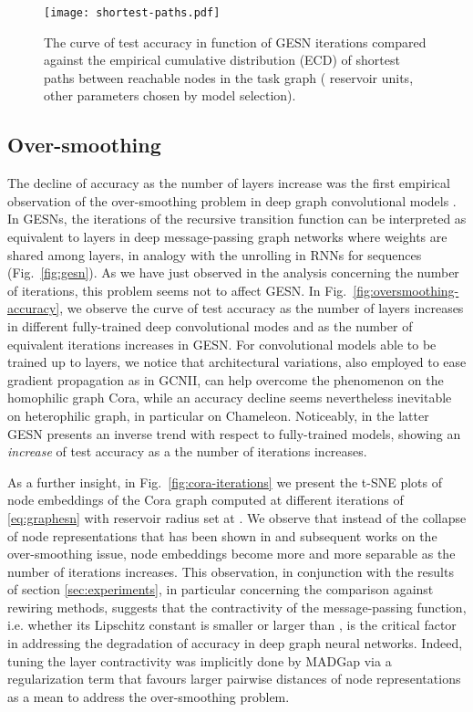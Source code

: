 \documentclass[final,5p,times,twocolumn]{elsarticle}
\begin{document}
\begin{figure*}
	\centering
	\texttt{[image: shortest-paths.pdf]}
	\caption{The curve of test accuracy in function of GESN iterations  compared against the empirical cumulative distribution (ECD) of shortest paths between reachable nodes in the task graph ( reservoir units, other parameters chosen by model selection).}
	\label{fig:shortest-paths}
\end{figure*}

\subsection{Over-smoothing}

The decline of accuracy as the number of layers increase was the first empirical observation of the over-smoothing problem in deep graph convolutional models \cite{Li2018}.
In GESNs, the iterations of the recursive transition function can be interpreted as equivalent to layers in deep message-passing graph networks where weights are shared among layers, in analogy with the unrolling in RNNs for sequences (Fig.~\ref{fig:gesn}).
As we have just observed in the analysis concerning the number of iterations, this problem seems not to affect GESN.
In Fig.~\ref{fig:oversmoothing-accuracy}, we observe the curve of test accuracy as the number of layers increases in different fully-trained deep convolutional modes and as the number of equivalent iterations increases in GESN.
For convolutional models able to be trained up to  layers, we notice that architectural variations, also employed to ease gradient propagation as in GCNII, can help overcome the phenomenon on the homophilic graph Cora, while an accuracy decline seems nevertheless inevitable on heterophilic graph, in particular on Chameleon.
Noticeably, in the latter GESN presents an inverse trend with respect to fully-trained models, showing an \emph{increase} of test accuracy as a the number of iterations increases.

As a further insight, in Fig.~\ref{fig:cora-iterations} we present the t-SNE plots of node embeddings of the Cora graph computed at different iterations of \eqref{eq:graphesn} with reservoir radius set at .
We observe that instead of the collapse of node representations that has been shown in \cite{Li2018} and subsequent works on the over-smoothing issue, node embeddings become more and more separable as the number of iterations increases.
This observation, in conjunction with the results of section \ref{sec:experiments}, in particular concerning the comparison against rewiring methods, suggests that the contractivity of the message-passing function, i.e. whether its Lipschitz constant is smaller or larger than , is the critical factor in addressing the degradation of accuracy in deep graph neural networks.
Indeed, tuning the layer contractivity was implicitly done by MADGap \cite{Chen2020} via a regularization term that favours larger pairwise distances of node representations as a mean to address the over-smoothing problem.
\end{document}

